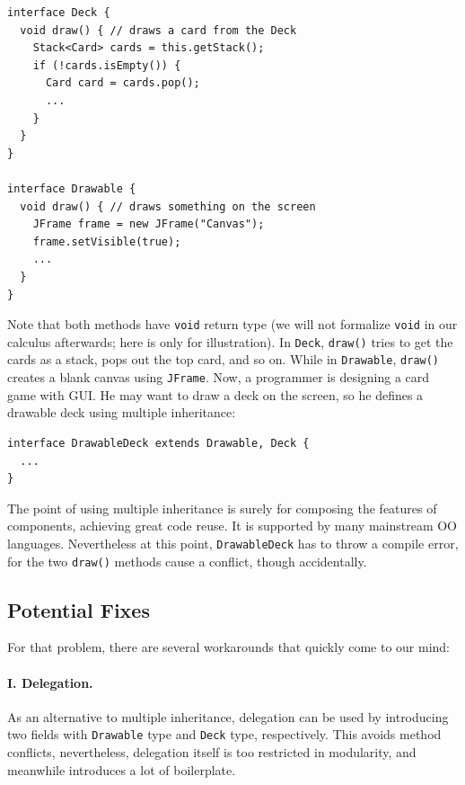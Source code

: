 \vspace{3pt}\begin{lstlisting}
interface Deck {
  void draw() { // draws a card from the Deck
    Stack<Card> cards = this.getStack();
    if (!cards.isEmpty()) {
      Card card = cards.pop();
      ...
    }
  }
}

interface Drawable {
  void draw() { // draws something on the screen
    JFrame frame = new JFrame("Canvas");
    frame.setVisible(true);
    ...
  }
}
\end{lstlisting}\vspace{3pt}
Note that both methods have \lstinline|void| return type (we will not formalize
\lstinline|void| in our calculus afterwards; here is only for illustration). In \lstinline|Deck|, \lstinline|draw()| tries to get the cards as a stack, pops
out the top card, and so on. While in \lstinline|Drawable|, \lstinline|draw()|
creates a blank canvas using \lstinline|JFrame|. Now, a programmer is designing a
card game with GUI. He may want to draw a deck on the screen, so he defines a drawable
deck using multiple inheritance:

\vspace{3pt}\begin{lstlisting}
interface DrawableDeck extends Drawable, Deck {
  ...
} 
\end{lstlisting}\vspace{3pt}
The point of using multiple inheritance is surely for composing the features of
components, achieving great code reuse. It is supported by many mainstream OO
languages. Nevertheless at this point, \lstinline|DrawableDeck| has to throw a compile
error, for the two \lstinline|draw()| methods cause a conflict, though accidentally.

\subsection{Potential Fixes}

For that problem, there are several workarounds that quickly come to our mind:

\paragraph{I. Delegation.} As an alternative to multiple inheritance, delegation can be used by
introducing two fields with \lstinline|Drawable| type and \lstinline|Deck| type, respectively. This avoids
method conflicts, nevertheless, delegation itself is too restricted in modularity, and meanwhile
introduces a lot of boilerplate.

